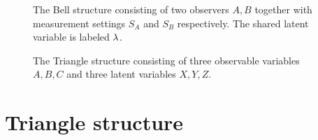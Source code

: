 \documentclass[aps, 10pt, english, twoside, pra, nofootinbib, tightenlines, longbibliography, superscriptaddress]{revtex4-1}
\begin{document}
    \begin{figure}
    \begin{nscenter}
        \begin{minipage}[t]{.48\textwidth}
            \centering
            \caption{The Bell structure consisting of two observers $A, B$ together with measurement settings $S_{A}$ and $S_{B}$ respectively. The shared latent variable is labeled $\lambda$.}
            \label{fig:bell_structure}
        \end{minipage}\hspace{0.04\textwidth}%
        \begin{minipage}[t]{.48\textwidth}
            \centering
            \caption{The Triangle structure consisting of three observable variables $A,B,C$ and three latent variables $X, Y, Z$.}
            \label{fig:triangle_structure}
        \end{minipage}
    \end{nscenter}
    \end{figure}


    \section{Triangle structure}
    \label{sec:triangle_structure}
\end{document}
